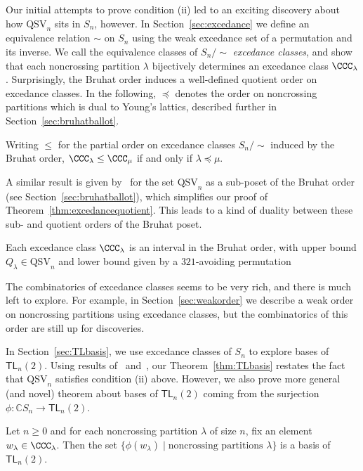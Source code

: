 \documentclass[12pt]{amsart}
\theoremstyle{definition}
\theoremstyle{remark}
\numberwithin{equation}{section}
\newenvironment{introthm}[1]{
  \renewcommand\theequation{#1}
  \thm
}{\endthm}
\newenvironment{introcor}[1]{
  \renewcommand\theequation{#1}
  \cor
}{\endcor}
\newcommand{\CC}{\mathbb{C}}
\newcommand{\TL}{\mathsf{TL}}
\newcommand{\QSV}{\mathrm{QSV}}
\begin{document}
Our initial attempts to prove condition (ii) led to an exciting discovery about how $\QSV_{n}$ sits in $S_{n}$, however.  
In Section~\ref{sec:excedance} we define an equivalence relation $\sim$ on $S_{n}$ using the weak excedance set of a permutation and its inverse.  
We call the equivalence classes of $S_{n}\big/\!\!\sim$ \emph{excedance classes}, and show that each noncrossing partition $\lambda$ bijectively determines an excedance class $\CCC_{\lambda}$.  
Surprisingly, the Bruhat order induces a well-defined quotient order on excedance classes.  
In the following, $\preceq$ denotes the order on noncrossing partitions which is dual to Young's lattics, described further in Section~\ref{sec:bruhatballot}.

\begin{introthm}{\ref{thm:excedancequotient}}
Writing $\le$ for the partial order on excedance classes $S_{n}\big/\!\! \sim$ induced by the Bruhat order, $\CCC_{\lambda} \le \CCC_{\mu}$ if and only if $\lambda \preceq \mu$.
\end{introthm}

A similar result is given by~\cite{GobetWilliams} for the set $\QSV_{n}$ as a sub-poset of the Bruhat order (see Section~\ref{sec:bruhatballot}), which simplifies our proof of Theorem~\ref{thm:excedancequotient}.  This leads to a kind of duality between these sub- and quotient orders of the Bruhat poset.

\begin{introcor}{\ref{cor:interval}}
Each excedance class $\CCC_{\lambda}$ is an interval in the Bruhat order, with upper bound $Q_{\lambda}\in \QSV_n$ and lower bound given by a $321$-avoiding permutation
\end{introcor}

The combinatorics of excedance classes seems to be very rich, and there is much left to explore.   
For example, in Section~\ref{sec:weakorder} we describe a weak order on noncrossing partitions using excedance classes, but the combinatorics of this order are still up for discoveries.  

In Section~\ref{sec:TLbasis}, we use excedance classes of $S_{n}$ to explore bases of $\TL_{n}(2)$.  Using results of~\cite{GobetWilliams} and~\cite{Zinno}, our Theorem~\ref{thm:TLbasis} restates the fact that $\QSV_{n}$ satisfies condition (ii) above.  However, we also prove more general (and novel) theorem about bases of $\TL_{n}(2)$ coming from the surjection $\phi: \CC S_{n} \to \TL_{n}(2)$.

\begin{introthm}{\ref{thm:TLbases}}
Let $n \ge 0$ and for each noncrossing partition $\lambda$ of size $n$, fix an element $w_{\lambda} \in \CCC_{\lambda}$. Then the set $\{\phi(w_{\lambda}) \;|\; \text{noncrossing partitions $\lambda$}\}$ is a basis of $\TL_{n}(2)$.
\end{introthm}
\end{document}
